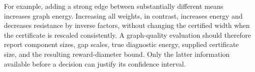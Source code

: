 For example, adding a strong edge between substantially different means increases graph energy. Increasing all weights, in contrast, increases energy and decreases resistance by inverse factors, without changing the certified width when the certificate is rescaled consistently. A graph-quality evaluation should therefore report component sizes, gap scales, true diagnostic energy, supplied certificate size, and the resulting reward-diameter bound. Only the latter information available before a decision can justify its confidence interval.

